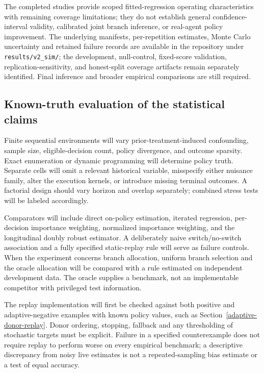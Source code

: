 The completed studies provide scoped fitted-regression operating characteristics with remaining coverage
limitations; they do not establish general confidence-interval validity, calibrated joint branch inference,
or real-agent policy improvement. The underlying manifests, per-repetition estimates, Monte Carlo uncertainty
and retained failure records are available in the repository under
\texttt{results/v2\_sim/}; the development, null-control, fixed-score validation, replication-sensitivity, and honest-split coverage artifacts
remain separately identified. Final inference and broader empirical comparisons are still required.

\subsection{Known-truth evaluation of the statistical claims}
Finite sequential environments will vary prior-treatment-induced confounding, sample size, eligible-decision count, policy divergence, and outcome sparsity. Exact enumeration or dynamic programming will determine policy truth. Separate cells will omit a relevant historical variable, misspecify either nuisance family, alter the execution kernels, or introduce missing terminal outcomes. A factorial design should vary horizon and overlap separately; combined stress tests will be labeled accordingly.

Comparators will include direct on-policy estimation, iterated regression, per-decision importance weighting, normalized importance weighting, and the longitudinal doubly robust estimator. A deliberately naive switch/no-switch association and a fully specified static-replay rule will serve as failure controls. When the experiment concerns branch allocation, uniform branch selection and the oracle allocation will be compared with a rule estimated on independent development data. The oracle supplies a benchmark, not an implementable competitor with privileged test information.

The replay implementation will first be checked against both positive and adaptive-negative examples with known policy values, such as Section~\ref{adaptive-donor-replay}. Donor ordering, stopping, fallback and any thresholding of stochastic targets must be explicit. Failure in a specified counterexample does not require replay to perform worse on every empirical benchmark; a descriptive discrepancy from noisy live estimates is not a repeated-sampling bias estimate or a test of equal accuracy.

